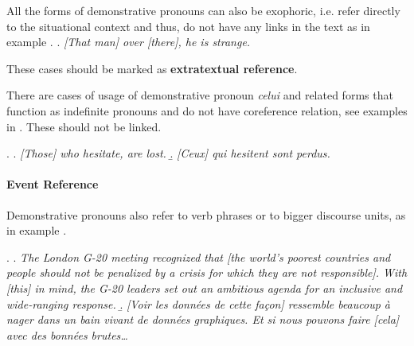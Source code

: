 \documentclass[a4paper]{article}
\begin{document}
% 

All the forms of demonstrative pronouns can also be exophoric, i.e. refer
directly to the situational context and thus, do not have any links in the text
as in example \Next. %
\ex.
\textsl{[That man] over [there], he is strange.}

These cases should be marked as {\bf extratextual reference}. 

There are cases of usage of demonstrative pronoun \textsl{celui} and related
forms that function as indefinite pronouns and do not have coreference relation,
see examples in \Next. These should not be linked.

\ex.
\a. {\sl [Those] who hesitate, are lost.}
\b. \textsl{[Ceux] qui hesitent sont perdus.}


\paragraph*{Event Reference}

Demonstrative pronouns also refer to verb phrases or to bigger discourse units, as in example \Next. 

\ex.
\a. {\sl The London G-20 meeting recognized that [the world's poorest countries and people should not be penalized by a crisis for which they are not responsible]. With [this] in mind, the G-20 leaders set out an ambitious agenda for an inclusive and wide-ranging response.}
\b. \textsl{[Voir les données de cette façon] ressemble beaucoup à nager dans un
bain vivant de données graphiques. Et si nous pouvons faire [cela] avec des
bonnées brutes\ldots}
\end{document}
